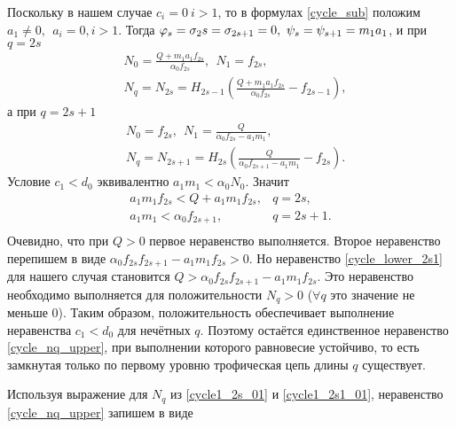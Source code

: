 Поскольку в нашем случае \(c_i = 0 ~ i > 1\), то в формулах \eqref{cycle_sub} положим \(a_1 \neq 0, ~~ a_i = 0, i>1\). Тогда \(\varphi_s = \sigma_2s = \sigma_{2s+1} = 0, ~ \psi_s = \psi_{s+1} = m_1 a_1 \), и при \(q = 2s\)
\begin{equation} \label{cycle1_2s_01}
    \begin{split}
        & N_0 = \frac{Q + m_1 a_1 f_{2s}}{\alpha_0 f_{2s}}, ~~ N_1 = f_{2s}, \\
        & N_q = N_{2s} = H_{2s-1} \left( \frac{Q + m_1 a_1 f_{2s}}{\alpha_0 f_{2s}} - f_{2s-1} \right),
    \end{split}
\end{equation}
а при \(q = 2s+1\)
\begin{equation} \label{cycle1_2s1_01}
    \begin{split}
        & N_0 = f_{2s}, ~~ N_1 = \frac{Q}{\alpha_0 f_{2s} - a_1 m_1}, \\
        & N_q = N_{2s+1} = H_{2s} \left( \frac{Q}{\alpha_0 f_{2s+1} - a_1 m_1} - f_{2s} \right).
    \end{split}
\end{equation}
Условие \( c_1 < d_0 \) эквивалентно \( a_1 m_1 < \alpha_0 N_0 \). Значит
\begin{equation*}
    \begin{matrix}
        a_1 m_1 f_{2s} < Q + a_1 m_1 f_{2s}, & q = 2s, \\
        a_1 m_1 < \alpha_0 f_{2s+1}, & q = 2s+1. \\
    \end{matrix}
\end{equation*}
Очевидно, что при \( Q > 0 \) первое неравенство выполняется. Второе неравенство перепишем в виде \( \alpha_0 f_{2s} f_{2s+1} - a_1 m_1 f_{2s} > 0 \). Но неравенство \eqref{cycle_lower_2s1} для нашего случая становится \( Q > \alpha_0 f_{2s} f_{2s+1} - a_1 m_1 f_{2s} \). Это неравенство необходимо выполняется для положительности \(N_q > 0\) (\(\forall q\) это значение не меньше 0). Таким образом, положительность обеспечивает выполнение неравенства \(c_1 < d_0\) для нечётных \(q\). Поэтому остаётся единственное неравенство \eqref{cycle_nq_upper}, при выполнении которого равновесие устойчиво, то есть замкнутая только по первому уровню трофическая цепь длины \(q\) существует.

Используя выражение для \(N_q\) из \eqref{cycle1_2s_01} и \eqref{cycle1_2s1_01}, неравенство \eqref{cycle_nq_upper} запишем в виде

